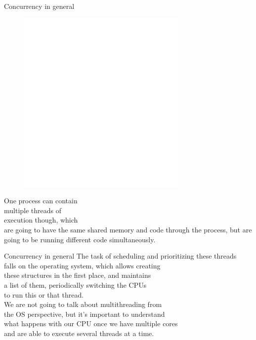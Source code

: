 \documentclass[usenames,dvipsnames,10pt,aspectratio=169]{beamer}
\begin{document}
\large
\begin{frame}{Concurrency in general}
\begin{figure}
\centering
\includegraphics[width=0.7\linewidth]{graphics/process2.png}
\end{figure}
	One process can contain\\
	multiple threads of\\
	execution though, which\\
	are going to have the same shared memory and code
	through the process, but are going to be running different code
	simultaneously.
	\vspace{2.8cm}
\end{frame}

\begin{frame}{Concurrency in general}
	\large
	The task of scheduling and prioritizing these threads\\
	falls on the operating system, which allows creating\\
	these structures in the first place, and maintains\\
	a list of them, periodically switching the CPUs\\
	to run this or that thread.\\
	\vspace{0.3cm}
	We are not going to talk about multithreading from\\
	the OS perspective, but it's important to understand\\
	what happens with our CPU once we have multiple cores\\
	and are able to execute several threads at a time.
\end{frame}
\end{document}
